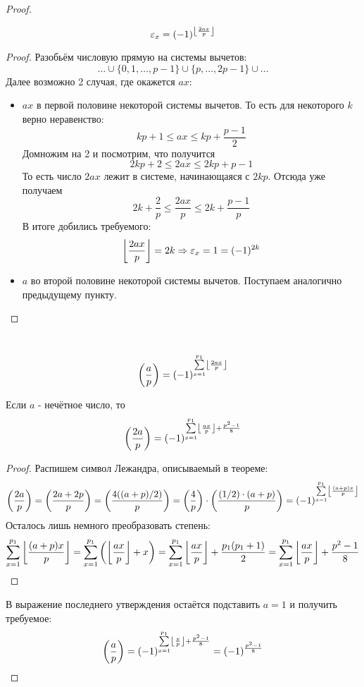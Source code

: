 \begin{proof}
	\begin{proposition}
		\[\varepsilon_x = (-1)^{\left\lfloor \frac{2ax}{p} \right\rfloor}\]
	\end{proposition}

	\begin{proof}
		Разобьём числовую прямую на системы вычетов:
		\[
			\ldots \cup \{0, 1, \ldots, p - 1\} \cup \{p, \ldots, 2p - 1\} \cup \ldots
		\]
		Далее возможно 2 случая, где окажется $ax$:
		\begin{itemize}
			\item $ax$ в первой половине некоторой системы вычетов. То есть для некоторого $k$ верно неравенство:
			\[
				kp + 1 \le ax \le kp + \frac{p - 1}{2}
			\]
			Домножим на 2 и посмотрим, что получится
			\[
				2kp + 2 \le 2ax \le 2kp + p - 1
			\]
			То есть число $2ax$ лежит в системе, начинающаяся с $2kp$. Отсюда уже получаем
			\[
				2k + \frac{2}{p} \le \frac{2ax}{p} \le 2k + \frac{p - 1}{p}
			\]
			В итоге добились требуемого:
			\[
				\left\lfloor \frac{2ax}{p} \right\rfloor = 2k \Rightarrow \varepsilon_x = 1 = (-1)^{2k}
			\]
			
			\item $a$ во второй половине некоторой системы вычетов. Поступаем аналогично предыдущему пункту.
		\end{itemize}
	\end{proof}

	\begin{corollary}~
		\[
			\left(\frac{ a }{ p }\right) = (-1)^{\sum\limits_{x = 1}^{p_1} \left\lfloor \frac{2ax}{p} \right\rfloor}
		\]
	\end{corollary}

	\begin{proposition}
		Если $a$ - нечётное число, то
		\[
			\left(\frac{ 2a }{ p }\right) = (-1)^{\sum\limits_{x = 1}^{p_1} \left\lfloor \frac{ax}{p} \right\rfloor + \frac{p^2 - 1}{8}}
		\]
	\end{proposition}

	\begin{proof}
		Распишем символ Лежандра, описываемый в теореме:
		\[
			\left(\frac{ 2a }{ p }\right) = \left(\frac{ 2a + 2p }{ p }\right) = \left(\frac{ 4((a + p) / 2) }{ p }\right) = \left(\frac{ 4 }{ p }\right) \cdot \left(\frac{ (1/2) \cdot (a + p) }{ p }\right) = (-1)^{\sum\limits_{x = 1}^{p_1} \left\lfloor \frac{(a + p)x}{p} \right\rfloor}
		\]
		Осталось лишь немного преобразовать степень:
		\[
			\sum\limits_{x = 1}^{p_1} \left\lfloor \frac{(a + p)x}{p} \right\rfloor = \sum\limits_{x = 1}^{p_1} \left(\left\lfloor \frac{ax}{p} \right\rfloor + x\right) = \sum\limits_{x = 1}^{p_1} \left\lfloor \frac{ax}{p} \right\rfloor + \frac{p_1(p_1 + 1)}{2} = \sum\limits_{x = 1}^{p_1} \left\lfloor \frac{ax}{p} \right\rfloor + \frac{p^2 - 1}{8}
		\]
	\end{proof}

	В выражение последнего утверждения остаётся подставить $a = 1$ и получить требуемое:
	\[
		\left(\frac{ a }{ p }\right) = (-1)^{\sum\limits_{x = 1}^{p_1} \left\lfloor \frac{x}{p} \right\rfloor + \frac{p^2 - 1}{8}} = (-1)^{\frac{p^2 - 1}{8}}
	\]
\end{proof}

